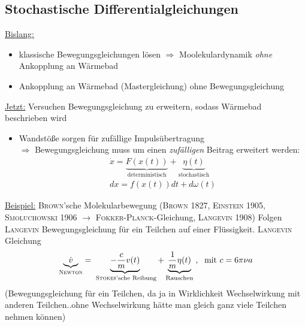 \documentclass[12pt]{article}
\begin{document}
\subsection{Stochastische Differentialgleichungen}
\underline{Bislang:}
\begin{itemize}
\item klassische Bewegungsgleichungen lösen $\Rightarrow$ Moolekulardynamik \textit{ohne} Ankopplung an Wärmebad 
\item Ankopplung an Wärmebad (Mastergleichung) ohne Bewegungsgleichung
\end{itemize}
\underline{Jetzt:} Versuchen Bewegungsgleichung zu erweitern, sodass Wärmebad beschrieben wird
 \begin{itemize}
 \item Wandstöße sorgen für zufällige Impulsübertragung \\
 $\Rightarrow$ Bewegungsgleichung muss um einen \textit{zufälligen} Beitrag erweitert werden:
 \begin{align}
 \dot{x} =\underbrace{ F(x(t))}_\text{deterministisch} +\underbrace{ \eta (t)}_\text{stochastisch} \\
 dx = f(x(t))dt + d\omega(t)
 \end{align}
  \end{itemize}
\underline{Beispiel:} \textsc{Brown}'sche Molekularbewegung (\textsc{Brown} 1827, \textsc{Einstein} 1905, \textsc{Smoluchowski} 1906 $\to$ \textsc{Fokker-Planck}-Gleichung, \textsc{Langevin} 1908) 
Folgen \textsc{Langevin} Bewegungsgleichung für ein Teilchen auf einer Flüssigkeit. \textsc{Langevin} Gleichung 
\begin{align}
\underbrace{\dot{v}}_\textsc{Newton}= \underbrace{-\frac{c}{m} v(t)}_\text{ \textsc{Stokes}'sche Reibung} + \underbrace{\frac{1}{m}\eta (t)}_\text{Rauschen} \; , \; \mbox{ mit } c= 6 \pi \nu a
\end{align} (Bewegungsgleichung für ein Teilchen, da ja in Wirklichkeit Wechselwirkung mit anderen Teilchen..ohne Wechselwirkung hätte man gleich ganz viele Teilchen nehmen können)
\end{document}
